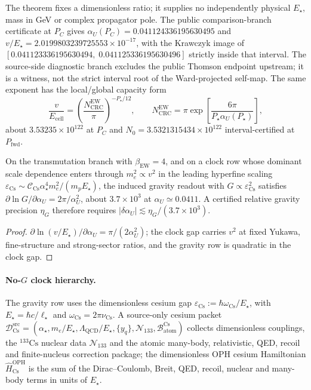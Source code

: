 The theorem fixes a dimensionless ratio; it supplies no independently
physical \(E_\star\), mass in GeV or complex propagator pole. The public
comparison-branch certificate at \(P_C\) gives
\(\alpha_U(P_C)=0.041124336195630495\) and
\(v/E_\star=2.0199803239725553\times10^{-17}\), with the Krawczyk image of
\([0.041123336195630494,\;0.041125336195630496]\) strictly inside that
interval. The source-side diagnostic branch excludes the public Thomson
endpoint upstream; it is a witness, not the strict interval root of the
Ward-projected self-map. The same exponent has the local/global capacity form
\[
\frac{v}{E_{\mathrm{cell}}}
=\left(\frac{N_{\mathrm{CRC}}^{\mathrm{EW}}}{\pi}\right)^{-P_\star/12},
\qquad
N_{\mathrm{CRC}}^{\mathrm{EW}}=\pi\exp\!\left[\frac{6\pi}{P_\star\alpha_U(P_\star)}\right],
\]
about \(3.53235\times10^{122}\) at \(P_C\) and
\(N_0=3.5321315434\times10^{122}\) interval-certified at \(P_{\mathrm{fwd}}\).

\begin{lemma}\label{lem:alpha-u-sensitivity}
On the transmutation branch with \(\beta_{\mathrm{EW}}=4\), and on a clock row
whose dominant scale dependence enters through \(m_e^2\propto v^2\) in the
leading hyperfine scaling
\(\varepsilon_{\mathrm{Cs}}\sim\mathcal C_{\mathrm{Cs}}\alpha_\star^4m_e^2/(m_pE_\star)\),
the induced gravity readout with \(G\propto\varepsilon_{\mathrm{Cs}}^2\)
satisfies \(\partial\ln G/\partial\alpha_U=2\pi/\alpha_U^2\), about
\(3.7\times10^3\) at \(\alpha_U\simeq0.0411\). A certified relative gravity
precision \(\eta_G\) therefore requires
\(|\delta\alpha_U|\lesssim\eta_G/(3.7\times10^3)\).
\end{lemma}

\begin{proof}
\(\partial\ln(v/E_\star)/\partial\alpha_U=\pi/(2\alpha_U^2)\); the clock gap
carries \(v^2\) at fixed Yukawa, fine-structure and strong-sector ratios, and
the gravity row is quadratic in the clock gap.
\end{proof}

\paragraph{No-\(G\) clock hierarchy.}
The gravity row uses the dimensionless cesium gap
\(\varepsilon_{\mathrm{Cs}}:=\hbar\omega_{\mathrm{Cs}}/E_\star\), with
\(E_\star=\hbar c/\ell_\star\) and \(\omega_{\mathrm{Cs}}=2\pi\nu_{\mathrm{Cs}}\).
A source-only cesium packet
\(\mathcal D_{\mathrm{Cs}}^{\mathrm{src}}=(\alpha_\star,m_e/E_\star,\Lambda_{\mathrm{QCD}}/E_\star,\{y_q\},\mathcal N_{133},\mathcal B_{\mathrm{atom}}^{\mathrm{Cs}})\)
collects dimensionless couplings, the \({}^{133}\mathrm{Cs}\) nuclear data
\(\mathcal N_{133}\) and the atomic many-body, relativistic, QED, recoil and
finite-nucleus correction package; the dimensionless OPH cesium Hamiltonian
\(\widehat H_{\mathrm{Cs}}^{\mathrm{OPH}}\) is the sum of the
Dirac--Coulomb, Breit, QED, recoil, nuclear and many-body terms in units of
\(E_\star\).

